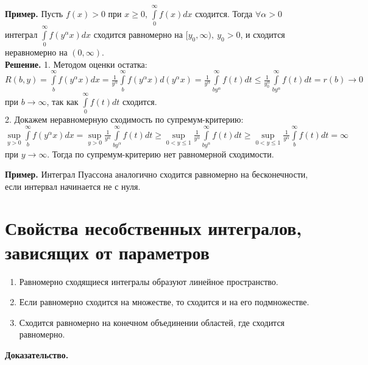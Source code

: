 \textbf{Пример.} Пусть $f(x)>0$ при  $x\geqslant 0$,
$\int\limits_{0}^{\infty} f(x)dx$ сходится.
Тогда $\forall \alpha>0$ интеграл $\int\limits_{0}^{\infty}f(y^\alpha x)dx$
сходится равномерно на $[y_0,\infty),~y_0>0$, и сходится неравномерно
на $(0,\infty)$.\\
\textbf{Решение.} 1. Методом оценки остатка: 
$R(b,y)=\int\limits_{b}^{\infty}f(y^\alpha x)dx=\frac{1}{y^\alpha}
\int\limits_{b}^{\infty} f(y^\alpha x)d(y^\alpha x)=\frac{1}{y^\alpha}
\int\limits_{by^\alpha}^{\infty}f(t)dt\leqslant \frac{1}{y^\alpha_0}
\int\limits_{by^\alpha}^{\infty} f(t)dt=r(b)\to 0$ при $b\to \infty$,
так как $\int\limits_{0}^{\infty} f(t)dt$ сходится.\\
2. Докажем неравномерную сходимость по супремум-критерию:
$\sup\limits_{y>0}\int\limits_{b}^{\infty} f(y^\alpha x)dx=
\sup\limits_{y>0}\frac{1}{y^\alpha}\int\limits_{by^\alpha}^{\infty} f(t)dt
\geqslant
\sup\limits_{0<y\leqslant 1}\frac{1}{y^\alpha}\int\limits_{by^\alpha}^{\infty}
f(t)dt\geqslant
\sup\limits_{0<y\leqslant 1}\frac{1}{y^\alpha}\int\limits_{b}^{\infty}f(t)dt=
\infty$ при $y\to \infty$. Тогда по супремум-критерию нет равномерной 
сходимости.

\textbf{Пример.} Интеграл Пуассона аналогично сходится равномерно на 
бесконечности, если интервал начинается не с нуля. 

\section{Свойства несобственных интегралов, зависящих от параметров}
\begin{enumerate}
    \item Равномерно сходящиеся интегралы образуют линейное пространство.
    \item Если равномерно сходится на множестве, то сходится и на его 
        подмножестве.
    \item Сходится равномерно на конечном объединении областей, 
        где сходится равномерно.
\end{enumerate}
\textbf{Доказательство.}


